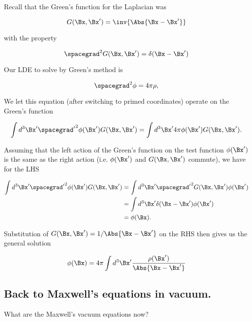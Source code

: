 Recall that the Green's function for the Laplacian was 

\begin{equation}\label{eqn:relativisticElectrodynamicsL14:292}
G(\Bx, \Bx') = \inv{\Abs{\Bx - \Bx'}}
\end{equation}

with the property 

\begin{equation}\label{eqn:relativisticElectrodynamicsL14:294}
\spacegrad^2 G(\Bx, \Bx') = \delta(\Bx - \Bx')
\end{equation}

Our LDE to solve by Green's method is

\begin{equation}\label{eqn:relativisticElectrodynamicsL14:296}
\spacegrad^2 \phi = 4 \pi \rho,
\end{equation}

We let this equation (after switching to primed coordinates) operate on the Green's function

\begin{equation}\label{eqn:relativisticElectrodynamicsL14:298}
\int d^3 \Bx' {\spacegrad'}^2 \phi(\Bx') G(\Bx, \Bx') 
=
\int d^3 \Bx' 4 \pi \phi(\Bx') G(\Bx, \Bx').
\end{equation}

Assuming that the left action of the Green's function on the test function $\phi(\Bx')$ is the same as the right action (i.e. $\phi(\Bx')$ and $G(\Bx, \Bx')$ commute), we have for the LHS

\begin{align*}
\int d^3 \Bx' {\spacegrad'}^2 \phi(\Bx') G(\Bx, \Bx') 
&=
\int d^3 \Bx' {\spacegrad'}^2 G(\Bx, \Bx') \phi(\Bx') \\
&=
\int d^3 \Bx' \delta(\Bx - \Bx') \phi(\Bx') \\
&=
\phi(\Bx).
\end{align*}

Substitution of $G(\Bx, \Bx') = 1/\Abs{\Bx - \Bx'}$ on the RHS then gives us the general solution

\begin{equation}\label{eqn:relativisticElectrodynamicsL14:300}
\phi(\Bx) = 4 \pi \int d^3 \Bx' \frac{\rho(\Bx') }{\Abs{\Bx - \Bx'}}
\end{equation}

\subsection{Back to Maxwell's equations in vacuum.}
What are the Maxwell's vacuum equations now?

